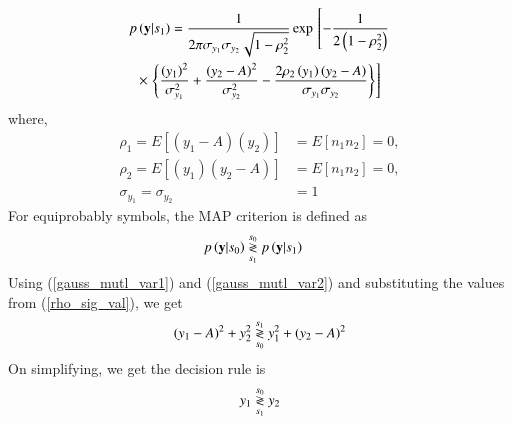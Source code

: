 \begin{enumerate}[label=\thesection.\arabic*.,ref=\thesection.\theenumi]
\begin{multline}
\end{multline}
\begin{multline}
\label{gauss_mutl_var2}
p\left(\mathbf{y}|s_1\right) = \frac{1}{2\pi\sigma_{y_1}\sigma_{y_2}\sqrt{1-\rho_2^2}}\exp{}\left[-\frac{1}{2\left(1-\rho_2^2\right)}\right.
\\
\times {}\left.\left\{\frac{\left(y_1\right)^2}{\sigma_{y_1}^2}+\frac{\left(y_2-A\right)^2}{\sigma_{y_2}^2}-\frac{2\rho_2\left(y_1\right)\left(y_2-A\right)}{\sigma_{y_1}\sigma_{y_2}}\right\}\right]
\end{multline}
where,
\begin{align}
\label{rho_sig_val}
\rho_1 = E[(y_1-A)(y_2)] &= E[n_1 n_2] = 0, \nonumber \\
\rho_2 = E[(y_1)(y_2-A)] &= E[n_1 n_2] = 0, \nonumber \\
\sigma_{y_1} = \sigma_{y_2} &= 1
\end{align}
For equiprobably symbols, the MAP criterion is defined as
%
\begin{align}
\label{eq:map_bfsk_dec}
p\left(\mathbf{y}|s_0\right) &\overset{s_0}{\underset{s_1}{\gtrless}} p\left(\mathbf{y}|s_1\right)
\end{align}
Using (\ref{gauss_mutl_var1}) and (\ref{gauss_mutl_var2}) and substituting the values from (\ref{rho_sig_val}),  we get
\begin{align}
(y_1 -A)^2 + y_2^2 \overset{s_1}{\underset{s_0}{\gtrless}} y_1^2 + (y_2 - A)^2
\end{align}
On simplifying, we get the decision rule is
\begin{align}
\label{eq:decision_rule}
y_1 \overset{s_0}{\underset{s_1}{\gtrless}} y_2
\end{align}


\end{enumerate}
